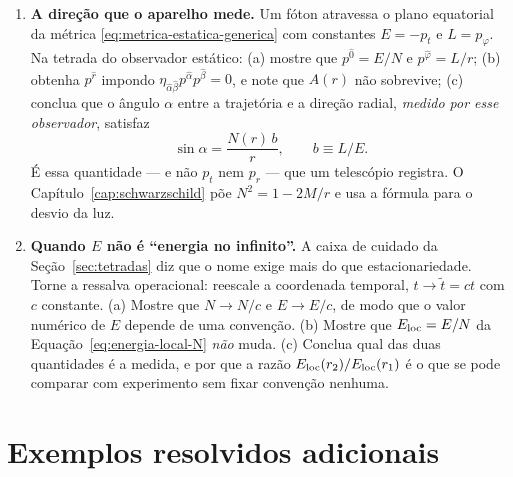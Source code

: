 \documentclass[12pt,a4paper,oneside]{book}
\theoremstyle{rgplain}
\theoremstyle{rgremark}
\begin{document}
\begin{enumerate}
  \item \textbf{A direção que o aparelho mede.} Um fóton atravessa o plano
  equatorial da métrica \eqref{eq:metrica-estatica-generica} com constantes
  $E=-p_t$ e $L=p_\varphi$. Na tetrada do observador estático: (a) mostre que
  $p^{\hat0}=E/N$ e $p^{\hat\varphi}=L/r$; (b) obtenha $p^{\hat r}$ impondo
  $\eta_{\hat\alpha\hat\beta}p^{\hat\alpha}p^{\hat\beta}=0$, e note que $A(r)$
  não sobrevive; (c) conclua que o ângulo $\alpha$ entre a trajetória e a
  direção radial, \emph{medido por esse observador}, satisfaz
  \[
    \sin\alpha=\frac{N(r)\,b}{r} ,
    \qquad b\equiv L/E .
  \]
  É essa quantidade --- e não $p_t$ nem $p_r$ --- que um telescópio registra. O
  Capítulo~\ref{cap:schwarzschild} põe $N^2=1-2M/r$ e usa a fórmula para o
  desvio da luz.

  \item \textbf{Quando $E$ não é ``energia no infinito''.} A caixa de cuidado
  da Seção~\ref{sec:tetradas} diz que o nome exige mais do que estacionariedade.
  Torne a ressalva operacional: reescale a coordenada temporal,
  $t\to\tilde t=ct$ com $c$ constante. (a) Mostre que $N\to N/c$ e $E\to E/c$,
  de modo que o valor numérico de $E$ depende de uma convenção. (b) Mostre que
  $E_{\rm loc}=E/N$ da Equação~\eqref{eq:energia-local-N} \emph{não} muda.
  (c) Conclua qual das duas quantidades é a medida, e por que a razão
  $E_{\rm loc}(r_2)/E_{\rm loc}(r_1)$ é o que se pode comparar com experimento
  sem fixar convenção nenhuma.
\end{enumerate}

\section{Exemplos resolvidos adicionais}
\label{sec:exemplos-cap7}
\end{document}
